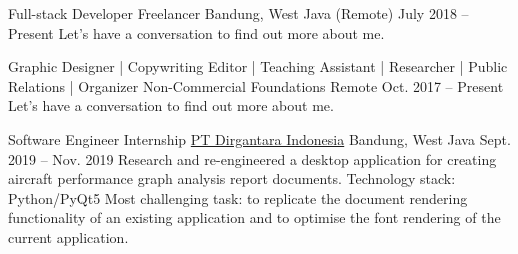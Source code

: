 \begin{cventries}

\cventry
{Full-stack Developer} %
{Freelancer} %
{Bandung, West Java (Remote)} %
{July 2018 -- Present} %
{ %
Let's have a conversation to find out more about me.
}


\cventry
{Graphic Designer | Copywriting Editor | Teaching Assistant | Researcher | Public Relations | Organizer} %
{Non-Commercial Foundations} %
{Remote} %
{Oct. 2017 -- Present} %
{ %
Let's have a conversation to find out more about me.
}






\cventry
{Software Engineer Internship} %
{\href{https://www.indonesian-aerospace.com/}{PT Dirgantara Indonesia}} %
{Bandung, West Java} %
{Sept. 2019 -- Nov. 2019} %
{ %
Research and re-engineered a desktop application for creating aircraft performance graph analysis report documents.
\linebreak
Technology stack: Python/PyQt5
\linebreak
Most challenging task: to replicate the document rendering functionality of an existing application and to optimise the font rendering of the current application.
}


\end{cventries}
